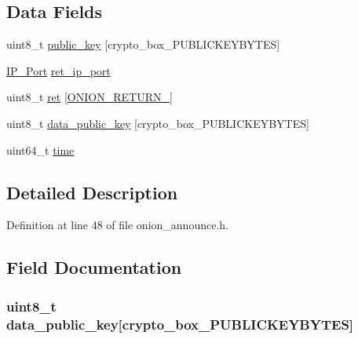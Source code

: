 \subsection*{Data Fields}
\begin{DoxyCompactItemize}
\item 
uint8\+\_\+t \hyperlink{struct_onion___announce___entry_aaa806bb1136fb3d4b5d8d8970b596ff7}{public\+\_\+key} \mbox{[}crypto\+\_\+box\+\_\+\+P\+U\+B\+L\+I\+C\+K\+E\+Y\+B\+Y\+T\+E\+S\mbox{]}
\item 
\hyperlink{struct_i_p___port}{I\+P\+\_\+\+Port} \hyperlink{struct_onion___announce___entry_a28f2dcc657352ee4855d05ed42e4a4af}{ret\+\_\+ip\+\_\+port}
\item 
uint8\+\_\+t \hyperlink{struct_onion___announce___entry_a860a2c4025701999e0d03f73b1863cdd}{ret} \mbox{[}\hyperlink{onion_8h_a3a333162e7c23bebfa7554654db9374e}{O\+N\+I\+O\+N\+\_\+\+R\+E\+T\+U\+R\+N\+\_}\mbox{]}
\item 
uint8\+\_\+t \hyperlink{struct_onion___announce___entry_add8f6d39a7818b6d3ff0fca42a0aadf4}{data\+\_\+public\+\_\+key} \mbox{[}crypto\+\_\+box\+\_\+\+P\+U\+B\+L\+I\+C\+K\+E\+Y\+B\+Y\+T\+E\+S\mbox{]}
\item 
uint64\+\_\+t \hyperlink{struct_onion___announce___entry_a5d34a8f2dfe25421b2b473a5fd37b0ed}{time}
\end{DoxyCompactItemize}


\subsection{Detailed Description}


Definition at line 48 of file onion\+\_\+announce.\+h.



\subsection{Field Documentation}
\hypertarget{struct_onion___announce___entry_add8f6d39a7818b6d3ff0fca42a0aadf4}{
\subsubsection[{data\+\_\+public\+\_\+key}]{\setlength{\rightskip}{0pt plus 5cm}uint8\+\_\+t data\+\_\+public\+\_\+key\mbox{[}crypto\+\_\+box\+\_\+\+P\+U\+B\+L\+I\+C\+K\+E\+Y\+B\+Y\+T\+E\+S\mbox{]}}}\label{struct_onion___announce___entry_add8f6d39a7818b6d3ff0fca42a0aadf4}


